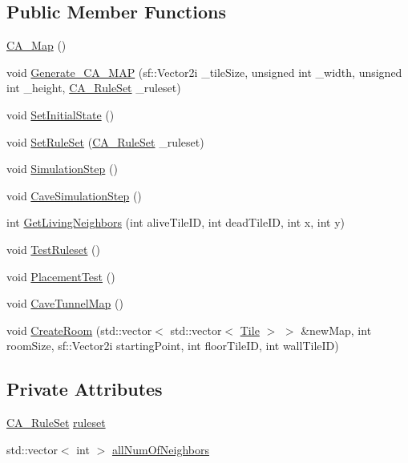 \subsection*{Public Member Functions}
\begin{DoxyCompactItemize}
\item 
\mbox{\hyperlink{class_c_a___map_a43e7cd49d1de02187bd3726d328c7b85}{C\+A\+\_\+\+Map}} ()
\item 
void \mbox{\hyperlink{class_c_a___map_a8db5cbcb8cef56f0ac58571425502b59}{Generate\+\_\+\+C\+A\+\_\+\+M\+AP}} (sf\+::\+Vector2i \+\_\+tile\+Size, unsigned int \+\_\+width, unsigned int \+\_\+height, \mbox{\hyperlink{_c_a_map_8hpp_a8502e9e74cc08ed2c245d58ff7cd4a88}{C\+A\+\_\+\+Rule\+Set}} \+\_\+ruleset)
\item 
void \mbox{\hyperlink{class_c_a___map_ad4c6a5b3ca7121d6c4593061d4bf3056}{Set\+Initial\+State}} ()
\item 
void \mbox{\hyperlink{class_c_a___map_a5d22c84ef623d63d99300d1f83af143e}{Set\+Rule\+Set}} (\mbox{\hyperlink{_c_a_map_8hpp_a8502e9e74cc08ed2c245d58ff7cd4a88}{C\+A\+\_\+\+Rule\+Set}} \+\_\+ruleset)
\item 
void \mbox{\hyperlink{class_c_a___map_a9f978dd06a224ab2acf97f1c532ec3da}{Simulation\+Step}} ()
\item 
void \mbox{\hyperlink{class_c_a___map_a36d031c797435985d1a833713b64ae98}{Cave\+Simulation\+Step}} ()
\item 
int \mbox{\hyperlink{class_c_a___map_ad57529f17a77b590fe93839c4b8bd5f9}{Get\+Living\+Neighbors}} (int alive\+Tile\+ID, int dead\+Tile\+ID, int x, int y)
\item 
void \mbox{\hyperlink{class_c_a___map_a7a3a75540c418bdcee3689ecfca4cbff}{Test\+Ruleset}} ()
\item 
void \mbox{\hyperlink{class_c_a___map_a142fc34721fe8d06cc93b61a27af9bda}{Placement\+Test}} ()
\item 
void \mbox{\hyperlink{class_c_a___map_aad2d89a0ccb584de480b315887c4932d}{Cave\+Tunnel\+Map}} ()
\item 
void \mbox{\hyperlink{class_c_a___map_a990656963de9c40138ae4babe0c3c28c}{Create\+Room}} (std\+::vector$<$ std\+::vector$<$ \mbox{\hyperlink{class_tile}{Tile}} $>$ $>$ \&new\+Map, int room\+Size, sf\+::\+Vector2i starting\+Point, int floor\+Tile\+ID, int wall\+Tile\+ID)
\end{DoxyCompactItemize}
\subsection*{Private Attributes}
\begin{DoxyCompactItemize}
\item 
\mbox{\hyperlink{_c_a_map_8hpp_a8502e9e74cc08ed2c245d58ff7cd4a88}{C\+A\+\_\+\+Rule\+Set}} \mbox{\hyperlink{class_c_a___map_a7f21b6e31fec0a42ba6b47c93e7675fd}{ruleset}}
\item 
std\+::vector$<$ int $>$ \mbox{\hyperlink{class_c_a___map_a621e0347874d4f80984e7644059a542e}{all\+Num\+Of\+Neighbors}}
\end{DoxyCompactItemize}
